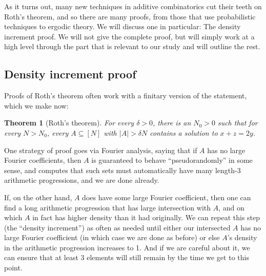 \documentclass{report}
\newtheorem{theorem}{Theorem}[section]
\theoremstyle{remark}
\numberwithin{equation}{section}
\begin{document}
As it turns out, many new techniques in additive combinatorics cut
their teeth on Roth's theorem, and so there are many proofs, from
those that use probabilistic techniques to ergodic theory.  We will
discuss one in particular: The density increment proof.  We will not
give the complete proof, but will simply work at a high level through
the part that is relevant to our study and will outline the rest.

\subsection{Density increment proof}

Proofs of Roth's theorem often work with a finitary version of the
statement, which we make now:

\begin{theorem}[Roth's theorem]
  For every $\delta > 0$, there is an $N_0 > 0$ such that for every
  $N > N_0$, every $A \subseteq [N]$ with $|A| > \delta N$ contains a
  solution to $x+z=2y$.
\end{theorem}

One strategy of proof goes via Fourier analysis, saying that if $A$
has no large Fourier coefficients, then $A$ is guaranteed to behave
``pseudorandomly'' in some sense, and computes that such sets must
automatically have many length-3 arithmetic progressions, and we are
done already.  

If, on the other hand, $A$ does have some large Fourier coefficient,
then one can find a long arithmetic progression that has large
intersection with $A$, and on which $A$ in fact has higher density
than it had originally.  We can repeat this step (the ``density
increment'') as often as needed until either our intersected $A$ has
no large Fourier coefficient (in which case we are done as before) or
else $A$'s density in the arithmetic progression increases to 1.  And
if we are careful about it, we can ensure that at least 3 elements
will still remain by the time we get to this point.
\end{document}
